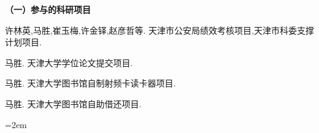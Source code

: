 
\begin{reseachlog}
\setlength{\parindent}{0em}



\textbf{（一）参与的科研项目}
\begin{enumerate}[{[}1{]}]
\item   许林英,马胜,崔玉梅,许金铎,赵彦哲等. 天津市公安局绩效考核项目,天津市科委支撑计划项目.
\item   马胜. 天津大学学位论文提交项目.
\item   马胜. 天津大学图书馆自制射频卡读卡器项目.
\item   马胜. 天津大学图书馆自助借还项目.
\end{enumerate}
\vfill
{}\hangindent=2em\noindent

\setlength{\parindent}{2em}
\end{reseachlog}
